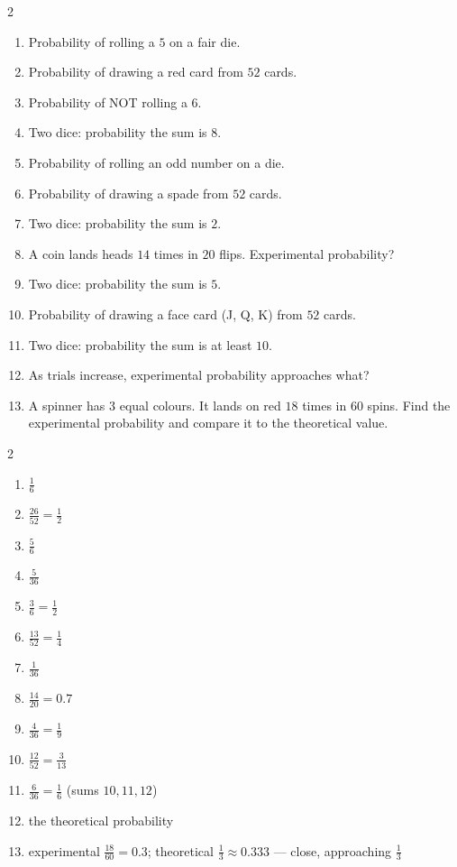 \documentclass[11pt]{article}
\begin{document}
\begin{recapbox}
\begin{multicols}{2}
\small
\begin{enumerate}[leftmargin=*,itemsep=3pt]
  \item Probability of rolling a $5$ on a fair die.
  \item Probability of drawing a red card from $52$ cards.
  \item Probability of NOT rolling a $6$.
  \item Two dice: probability the sum is $8$.
  \item Probability of rolling an odd number on a die.
  \item Probability of drawing a spade from $52$ cards.
  \item Two dice: probability the sum is $2$.
  \item A coin lands heads $14$ times in $20$ flips. Experimental probability?
  \item Two dice: probability the sum is $5$.
  \item Probability of drawing a face card (J, Q, K) from $52$ cards.
  \item Two dice: probability the sum is at least $10$.
  \item As trials increase, experimental probability approaches what?
  \item A spinner has $3$ equal colours. It lands on red $18$ times in $60$ spins. Find the experimental probability and compare it to the theoretical value.
\end{enumerate}
\end{multicols}
\end{recapbox}

\begin{keybox}
\begin{multicols}{2}
\small
\begin{enumerate}[leftmargin=*,itemsep=3pt]
  \item $\tfrac16$
  \item $\tfrac{26}{52}=\tfrac12$
  \item $\tfrac56$
  \item $\tfrac{5}{36}$
  \item $\tfrac36=\tfrac12$
  \item $\tfrac{13}{52}=\tfrac14$
  \item $\tfrac{1}{36}$
  \item $\tfrac{14}{20}=0.7$
  \item $\tfrac{4}{36}=\tfrac19$
  \item $\tfrac{12}{52}=\tfrac{3}{13}$
  \item $\tfrac{6}{36}=\tfrac16$ (sums $10,11,12$)
  \item the theoretical probability
  \item experimental $\tfrac{18}{60}=0.3$; theoretical $\tfrac13\approx0.333$ — close, approaching $\tfrac13$
\end{enumerate}
\end{multicols}
\end{keybox}
\end{document}
